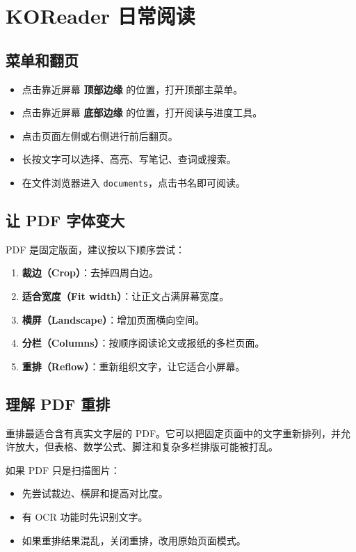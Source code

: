 \documentclass[10pt,a4paper]{article}
\begin{document}
\section{KOReader 日常阅读}

\subsection{菜单和翻页}

\begin{itemize}
  \item 点击靠近屏幕 \textbf{顶部边缘} 的位置，打开顶部主菜单。
  \item 点击靠近屏幕 \textbf{底部边缘} 的位置，打开阅读与进度工具。
  \item 点击页面左侧或右侧进行前后翻页。
  \item 长按文字可以选择、高亮、写笔记、查词或搜索。
  \item 在文件浏览器进入 \texttt{documents}，点击书名即可阅读。
\end{itemize}

\subsection{让 PDF 字体变大}

PDF 是固定版面，建议按以下顺序尝试：

\begin{enumerate}
  \item \textbf{裁边（Crop）}：去掉四周白边。
  \item \textbf{适合宽度（Fit width）}：让正文占满屏幕宽度。
  \item \textbf{横屏（Landscape）}：增加页面横向空间。
  \item \textbf{分栏（Columns）}：按顺序阅读论文或报纸的多栏页面。
  \item \textbf{重排（Reflow）}：重新组织文字，让它适合小屏幕。
\end{enumerate}

\subsection{理解 PDF 重排}

重排最适合含有真实文字层的 PDF。它可以把固定页面中的文字重新排列，并允许放大，但表格、数学公式、脚注和复杂多栏排版可能被打乱。

如果 PDF 只是扫描图片：

\begin{itemize}
  \item 先尝试裁边、横屏和提高对比度。
  \item 有 OCR 功能时先识别文字。
  \item 如果重排结果混乱，关闭重排，改用原始页面模式。
\end{itemize}
\end{document}
